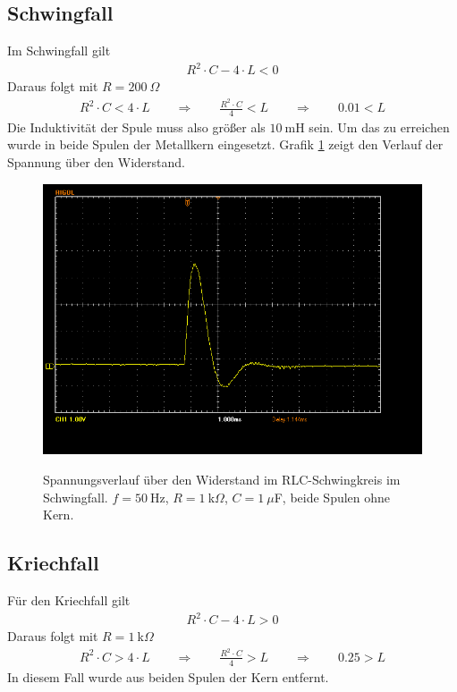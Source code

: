 \documentclass{article}
\begin{document}
\subsection{Schwingfall}


Im Schwingfall gilt
\begin{align*}
R^2\cdot C - 4\cdot L < 0
\end{align*}
Daraus folgt mit $R=200~\Omega$
\begin{align*}
R^2\cdot C < 4\cdot L \qquad\Longrightarrow\qquad \frac{R^2\cdot C}{4} < L \qquad\Longrightarrow\qquad 0.01 < L
\end{align*}
Die Induktivität der Spule muss also größer als $10~$mH sein. Um das zu erreichen wurde in beide Spulen der Metallkern eingesetzt. Grafik \ref{fig:schwing} zeigt den Verlauf der Spannung über den Widerstand.

\begin{figure}[H]
\caption{Spannungsverlauf über den Widerstand im RLC-Schwingkreis im Schwingfall. $f=50~$Hz, $R=1~$k$\Omega$, $C=1~\mu$F, beide Spulen ohne Kern.}
\label{fig:schwing}
{\centering
\includegraphics[scale=0.4]{winkler/schwingfall.png}}
\end{figure}


\subsection{Kriechfall}

Für den Kriechfall gilt
\begin{align*}
R^2\cdot C - 4\cdot L > 0
\end{align*}
Daraus folgt mit $R=1~$k$\Omega$
\begin{align*}
R^2\cdot C > 4\cdot L  \qquad\Longrightarrow\qquad \frac{R^2\cdot C}{4} > L \qquad\Longrightarrow\qquad 0.25 > L
\end{align*}
In diesem Fall wurde aus beiden Spulen der Kern entfernt. 
\end{document}
